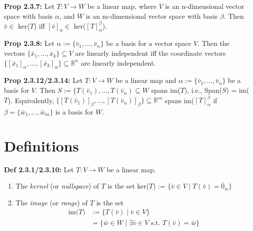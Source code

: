 \bigskip 

\noindent 
\textbf{Prop 2.3.7:} Let $T: V \rightarrow W$ be a linear map, where $V$ is an n-dimensional vector space with basis $\alpha$, and $W$ is an m-dimensional vector space with basis $\beta$. Then $\bar v \in$ ker($T$) iff $[\bar v]_\alpha \in $ ker($[T]_\alpha ^ \beta$).

\bigskip 

\noindent 
\textbf{Prop 2.3.8:} Let $\alpha := \{\bar v_1, \ldots , \bar v_n \}$ be a basis for a vector space $V$. Then the vectors $\{\bar x_1, \ldots , \bar x_k \} \subseteq V$ are linearly independent iff the coordinate vectors $\{[\bar x_1]_\alpha, \ldots , [\bar x_k]_\alpha \} \subseteq \mathbb{R}^n$ are linearly independent. 

\bigskip 

\noindent 
\textbf{Prop 2.3.12/2.3.14:} Let $T: V \rightarrow W$ be a linear map and $\alpha := \{\bar v_1, \ldots , \bar v_n \}$ be a basis for $V$. Then $S := \{T(\bar v_1), \ldots , T(\bar v_n) \subseteq W$ spans im($T$), i.e., Span($S$) = im($T$). Equivalently, $\{[T(\bar v_1)]_\beta , \ldots , [T(\bar v_n)]_\beta \} \subseteq \mathbb{R}^m$ spans im($[T]_\alpha ^ \beta$ if $\beta = \{\bar w_1, \ldots , \bar w_m \}$ is a basis for $W$. 

\pagebreak
\section*{Definitions}
\textbf{Def 2.3.1/2.3.10:} Let $T: V \rightarrow W$ be a linear map. 
\begin{enumerate}
    \item The \textit{kernel} (or \textit{nullspace}) of $T$ is the set ker($T$) := $\{\bar v \in V \mid T(\bar v) = \bar 0_w\}$ 
    \item The \textit{image} (or \textit{range}) of $T$ is the set
    \begin{align*}
        \text{im($T$)} &:= \{T(\bar v) \mid \bar v \in V\} \\
        &= \{\bar w \in W \mid \exists \bar v \in V \text{ s.t. } T(\bar v) = \bar w\}
    \end{align*}
\end{enumerate}

